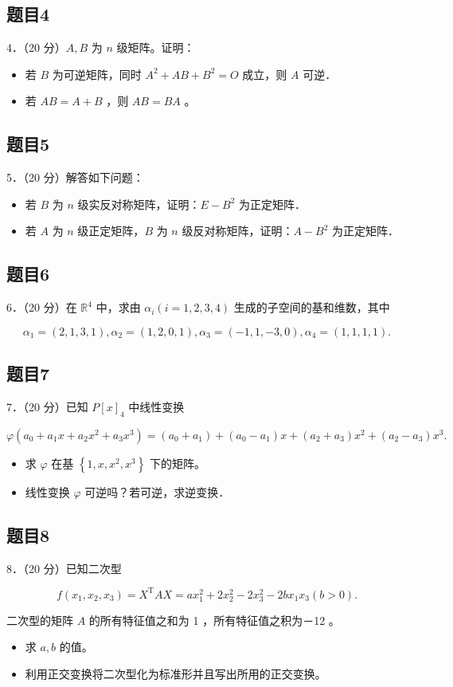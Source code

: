 \documentclass{article}
\begin{document}
\subsection{题目4}
4．（20 分）\(A, B\) 为 \(n\) 级矩阵。证明：

\begin{itemize}
  \item[（1）] 若 \(B\) 为可逆矩阵，同时 \(A^{2}+A B+B^{2}=O\) 成立，则 \(A\) 可逆．
  \item[（2）] 若 \(A B=A+B\) ，则 \(A B=B A\) 。
\end{itemize}

\subsection{题目5}
5．（20 分）解答如下问题：

\begin{itemize}
  \item[（1）] 若 \(B\) 为 \(n\) 级实反对称矩阵，证明：\(E-B^{2}\) 为正定矩阵．
  \item[（2）] 若 \(A\) 为 \(n\) 级正定矩阵，\(B\) 为 \(n\) 级反对称矩阵，证明：\(A-B^{2}\) 为正定矩阵．
\end{itemize}

\subsection{题目6}
6．（20 分）在 \(\mathbb{R}^{4}\) 中，求由 \(\alpha_{i}(i=1,2,3,4)\) 生成的子空间的基和维数，其中

\[
\alpha_{1}=(2,1,3,1), \alpha_{2}=(1,2,0,1), \alpha_{3}=(-1,1,-3,0), \alpha_{4}=(1,1,1,1) .
\]

\subsection{题目7}
7．（20 分）已知 \(P[x]_{4}\) 中线性变换

\[
\varphi\left(a_{0}+a_{1} x+a_{2} x^{2}+a_{3} x^{3}\right)=\left(a_{0}+a_{1}\right)+\left(a_{0}-a_{1}\right) x+\left(a_{2}+a_{3}\right) x^{2}+\left(a_{2}-a_{3}\right) x^{3} .
\]

\begin{itemize}
  \item[（1）] 求 \(\varphi\) 在基 \(\left\{1, x, x^{2}, x^{3}\right\}\) 下的矩阵。
  \item[（2）] 线性变换 \(\varphi\) 可逆吗？若可逆，求逆变换．
\end{itemize}

\subsection{题目8}
8．（20 分）已知二次型

\[
f\left(x_{1}, x_{2}, x_{3}\right)=X^{\mathrm{T}} A X=a x_{1}^{2}+2 x_{2}^{2}-2 x_{3}^{2}-2 b x_{1} x_{3}(b>0) .
\]

二次型的矩阵 \(A\) 的所有特征值之和为 1 ，所有特征值之积为－12 。

\begin{itemize}
  \item[（1）] 求 \(a, b\) 的值。
  \item[（2）] 利用正交变换将二次型化为标准形并且写出所用的正交变换。
\end{itemize}
\end{document}
